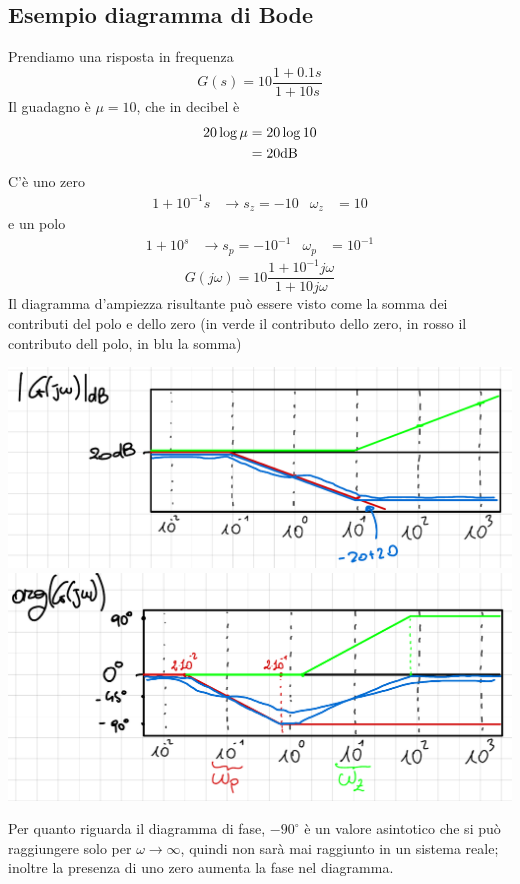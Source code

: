 \documentclass{article}
\numberwithin{equation}{subsection}
\let\oldsubsection\subsection%
\renewcommand{\subsection}{%
  \renewcommand{\theequation}{\thesubsection.\arabic{equation}}%
  \oldsubsection}%
\begin{document}
\subsection{Esempio diagramma di Bode}
Prendiamo una risposta in frequenza
\[
    G(s) = 10 \frac{1 + 0.1 s}{1+10 s}
\]
Il guadagno è $\mu = 10$, che in decibel è
\begin{align*}
    20 \log \mu &= 20 \log 10\\
    &= 20 \text{dB}
\end{align*}
C'è uno zero 
\begin{align*}
    1+10^{-1}s &\longrightarrow s_z = -10 & \omega_z &= 10
\end{align*} 
e un polo 
\begin{align*}
    1+10^s &\longrightarrow s_p = -10^{-1} & \omega_p &= 10^{-1}
\end{align*} 
\[
    G(j\omega) = 10 \frac{1 + 10^{-1}j \omega}{1 + 10 j \omega}
\]
Il diagramma d'ampiezza risultante può essere visto come la somma dei contributi del polo e dello zero (in {\color{green} verde} il contributo dello zero, in {\color{red} rosso} il contributo dell polo, in {\color{blue} blu} la somma)
\begin{center}
    \includegraphics[scale=0.25]{Images/Esempio_diagramma_amp.png}
    \includegraphics[scale=0.25]{Images/Esempio_diagramma_fase.png}
\end{center}
Per quanto riguarda il diagramma di fase, $-90^{\circ}$ è un valore asintotico che si può raggiungere solo per $\omega \rightarrow \infty$, quindi non sarà mai raggiunto in un sistema reale; inoltre la presenza di uno zero aumenta la fase nel diagramma.
\end{document}

